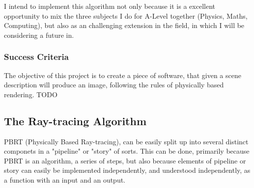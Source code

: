 \documentclass[../main.tex]{subfiles}
\begin{document}
I intend to implement this algorithm not only because it is a excellent opportunity to mix the three subjects I do for A-Level together (Physics, Maths, Computing), but also as an challenging extension in the field, in which I will be considering a future in.
\subsubsection{Success Criteria}
The objective of this project is to create a piece of software, that given a scene description will produce an image, following the rules of physically based rendering. 
TODO
\subsection{The Ray-tracing Algorithm}
PBRT (Physically Based Ray-tracing), can be easily split up into several distinct componets in a "pipeline" or "story" of sorts. This can be done, primarily because PBRT is an algorithm, a series of steps, but also because elements of pipeline or story can easily be implemented independently, and understood independently, as a function with an input and an output.
\end{document}
